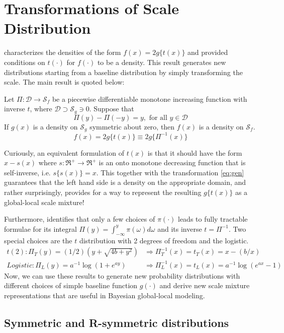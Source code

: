 \documentclass[letterpaper,11pt]{article}
\begin{document}
\section{Transformations of Scale Distribution} 

\cite{jones2014generating} characterizes the densities of the form $f(x) = 2g\{ t(x) \}$ and provided conditions on $t(\cdot)$ for $f(\cdot)$ to be a density. This result generates new distributions starting from a baseline distribution by simply transforming the scale. The main result is quoted below: 
\begin{proposition}\label{prop:jones}
Let $\Pi: \mathcal{D} \to \mathcal{S}_{f}$ be a piecewise differentiable monotone increasing function with inverse $t$, where $\mathcal{D} \supset \mathcal{S}_{g} \ni 0$. Suppose that 
$$
\Pi(y) - \Pi(-y) = y, \text{ for all } y \in \mathcal{D}
$$
If $g(x)$ is a density on $\mathcal{S}_{g}$ symmetric about zero, then $f(x)$ is a density on $\mathcal{S}_{f}$.
$$
f(x) = 2g \{ t(x) \} \equiv 2g \{ \Pi^{-1}(x) \}
$$
\end{proposition}
Curiously, an equivalent formulation of $t(x)$ is that it should have the form $x-s(x)$ where $s : \Re^+ \to \Re^+$ is an onto monotone decreasing function that is self-inverse, i.e. $s\{ s(x)\} = x$. This together with the \CS transformation \eqref{eq:gen} guarantees that the left hand side is a density on the appropriate domain, and rather surprisingly, provides for a way to represent the resulting $g\{t(x)\}$ as a global-local scale mixture! 
 
Furthermore, \cite{jones2014generating} identifies that only a few choices of $\pi(\cdot)$ leads to fully tractable formulae for its integral $\Pi(y) = \int_{-\infty}^{y} \pi(\omega) d\omega$ and its inverse $t = \Pi^{-1}$. Two special choices are the $t$ distribution with 2 degrees of freedom and the logistic. 
\begin{align}
t(2): \Pi_{T}(y) = (1/2)(y+\sqrt{4b+y^2}) & \Rightarrow \Pi_T^{-1}(x) = t_T(x) = x - (b/x) \\
Logistic: \Pi_{L}(y) = a^{-1} \log(1+e^{ay}) & \Rightarrow \Pi_L^{-1}(x) = t_L(x) = a^{-1} \log(e^{ax}-1) 
\end{align}
Now, we can use these results to generate new probability distributions with different choices of simple baseline function $g(\cdot)$ and derive new scale mixture representations that are useful in Bayesian global-local modeling. 

\subsection{Symmetric and R-symmetric distributions}
\end{document}

